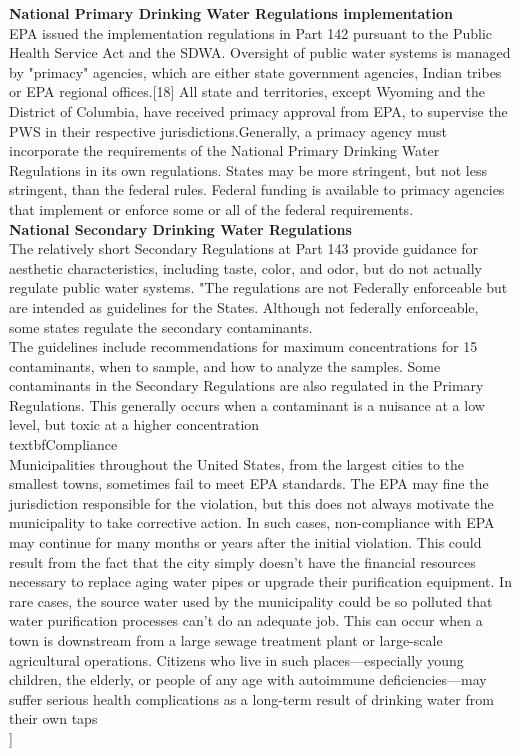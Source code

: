 \textbf{National Primary Drinking Water Regulations implementation}\\
EPA issued the implementation regulations in Part 142 pursuant to the Public Health Service Act and the SDWA. Oversight of public water systems is managed by "primacy" agencies, which are either state government agencies, Indian tribes or EPA regional offices.[18] All state and territories, except Wyoming and the District of Columbia, have received primacy approval from EPA, to supervise the PWS in their respective jurisdictions.Generally, a primacy agency must incorporate the requirements of the National Primary Drinking Water Regulations in its own regulations. States may be more stringent, but not less stringent, than the federal rules. Federal funding is available to primacy agencies that implement or enforce some or all of the federal requirements.\\
\textbf{National Secondary Drinking Water Regulations}\\
The relatively short Secondary Regulations at Part 143 provide guidance for aesthetic characteristics, including taste, color, and odor, but do not actually regulate public water systems. "The regulations are not Federally enforceable but are intended as guidelines for the States.  Although not federally enforceable, some states regulate the secondary contaminants.\\
The guidelines include recommendations for maximum concentrations for 15 contaminants, when to sample, and how to analyze the samples. Some contaminants in the Secondary Regulations are also regulated in the Primary Regulations. This generally occurs when a contaminant is a nuisance at a low level, but toxic at a higher concentration\\
textbf{Compliance}\\
Municipalities throughout the United States, from the largest cities to the smallest towns, sometimes fail to meet EPA standards. The EPA may fine the jurisdiction responsible for the violation, but this does not always motivate the municipality to take corrective action. In such cases, non-compliance with EPA may continue for many months or years after the initial violation. This could result from the fact that the city simply doesn't have the financial resources necessary to replace aging water pipes or upgrade their purification equipment. In rare cases, the source water used by the municipality could be so polluted that water purification processes can't do an adequate job. This can occur when a town is downstream from a large sewage treatment plant or large-scale agricultural operations. Citizens who live in such places—especially young children, the elderly, or people of any age with autoimmune deficiencies—may suffer serious health complications as a long-term result of drinking water from their own taps\\]

